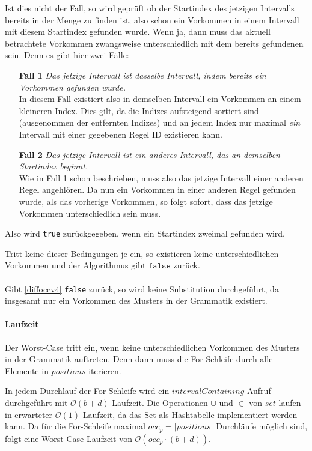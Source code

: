 Ist dies nicht der Fall, so wird geprüft ob der Startindex des jetzigen Intervalls bereits in der Menge zu finden ist, also schon ein Vorkommen in einem Intervall mit diesem Startindex gefunden wurde. Wenn ja, dann muss das aktuell betrachtete Vorkommen zwangsweise unterschiedlich mit dem bereits gefundenen sein. Denn es gibt hier zwei Fälle:
\begin{itemize}
    \item[\textbf{Fall 1}] \emph{Das jetzige Intervall ist dasselbe Intervall, indem bereits ein Vorkommen gefunden wurde.}\\
    In diesem Fall existiert also in demselben Intervall ein Vorkommen an einem kleineren Index. Dies gilt, da die Indizes aufsteigend sortiert sind (ausgenommen der entfernten Indizes) und an jedem Index nur maximal \emph{ein} Intervall mit einer gegebenen Regel ID existieren kann. 
    \item[\textbf{Fall 2}] \emph{Das jetzige Intervall ist ein anderes Intervall, das an demselben Startindex beginnt.}\\
    Wie in Fall 1 schon beschrieben, muss also das jetzige Intervall einer anderen Regel angehlören. Da nun ein Vorkommen in einer anderen Regel gefunden wurde, als das vorherige Vorkommen, so folgt sofort, dass das jetzige Vorkommen unterschiedlich sein muss. 
\end{itemize}   
Also wird \texttt{true} zurückgegeben, wenn ein Startindex zweimal gefunden wird.

Tritt keine dieser Bedingungen je ein, so existieren keine unterschiedlichen Vorkommen und der Algorithmus gibt $\texttt{false}$ zurück.\\\\
Gibt \autoref{diffoccv4} \texttt{false} zurück, so wird keine Substitution durchgeführt, da insgesamt nur ein Vorkommen des Musters in der Grammatik existiert.

\paragraph{Laufzeit}

Der Worst-Case tritt ein, wenn keine unterschiedlichen Vorkommen des Musters in der Grammatik auftreten. Denn dann muss die For-Schleife durch alle Elemente in $positions$ iterieren.

In jedem Durchlauf der For-Schleife wird ein $intervalContaining$ Aufruf durchgeführt mit $\mathcal{O}(b + d)$ Laufzeit. Die Operationen $\cup$ und $\in$ von $set$ laufen in erwarteter $\mathcal{O}(1)$ Laufzeit, da das Set als Hashtabelle implementiert werden kann.
Da für die For-Schleife maximal $occ_p = |positions|$ Durchläufe möglich sind, folgt eine Worst-Case Laufzeit von $\mathcal{O}(occ_p \cdot (b + d))$.  

